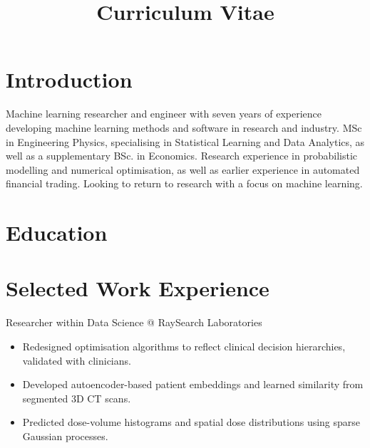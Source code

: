 \documentclass[11pt,a4paper]{moderncv}
\title{Curriculum Vitae}
\begin{document}
\makecvtitle

\section*{Introduction}

Machine learning researcher and engineer with seven years of experience developing machine learning methods and software in research and industry. MSc in Engineering Physics, specialising in Statistical Learning and Data Analytics, as well as a supplementary BSc. in Economics. Research experience in probabilistic modelling and numerical optimisation, as well as earlier experience in automated financial trading. Looking to return to research with a focus on machine learning.

\section{Education}





\section{Selected Work Experience}

\large{Researcher within Data Science @ RaySearch Laboratories}
\normalsize
\begin{itemize}
    \item Redesigned optimisation algorithms to reflect clinical decision hierarchies, validated with clinicians.
    \item Developed autoencoder-based patient embeddings and learned similarity from segmented 3D CT scans.
    \item Predicted dose-volume histograms and spatial dose distributions using sparse Gaussian processes.
\end{itemize}
\end{document}

